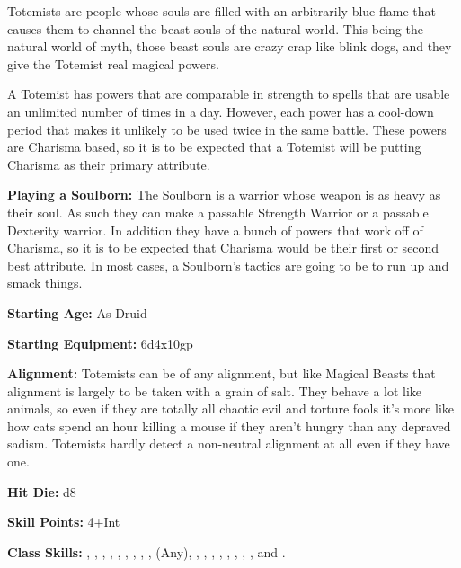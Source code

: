 
Totemists are people whose souls are filled with an arbitrarily blue flame that causes them to channel the beast souls of the natural world. This being the natural world of myth, those beast souls are crazy crap like blink dogs, and they give the Totemist real magical powers.

A Totemist has powers that are comparable in strength to spells that are usable an unlimited number of times in a day. However, each power has a cool-down period that makes it unlikely to be used twice in the same battle. These powers are Charisma based, so it is to be expected that a Totemist will be putting Charisma as their primary attribute.

\textbf{Playing a Soulborn:} The Soulborn is a warrior whose weapon is as heavy as their soul. As such they can make a passable Strength Warrior or a passable Dexterity warrior. In addition they have a bunch of powers that work off of Charisma, so it is to be expected that Charisma would be their first or second best attribute. In most cases, a Soulborn's tactics are going to be to run up and smack things.

\textbf{Starting Age:} As Druid

\textbf{Starting Equipment:} 6d4x10gp

\textbf{Alignment:} Totemists can be of any alignment, but like Magical Beasts that alignment is largely to be taken with a grain of salt. They behave a lot like animals, so even if they are totally all chaotic evil and torture fools it's more like how cats spend an hour killing a mouse if they aren't hungry than any depraved sadism. Totemists hardly detect a non-neutral alignment at all even if they have one.

\textbf{Hit Die:} d8

\modebab{}

\poorfor{}
\poorref{}
\goodwil{}

\textbf{Skill Points:} 4+Int

\textbf{Class Skills:} , , , , , , , , ,  (Any), , , , , , , , , and .

